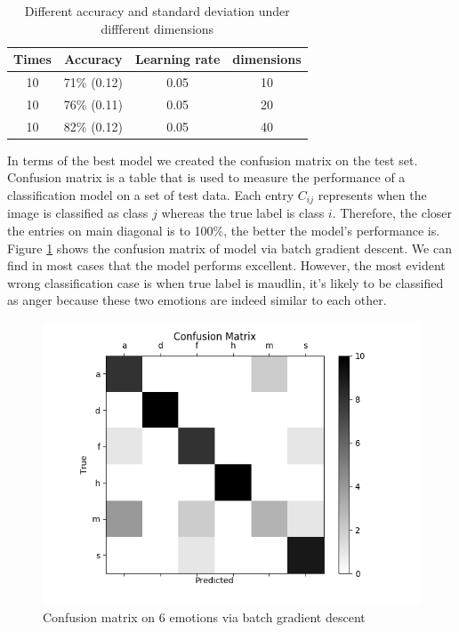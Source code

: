 \documentclass{article}
\begin{document}
\begin{table}
  \setlength{\tabcolsep}{9mm}
  \label{table: softmax_bgd}
  \centering
  \begin{tabular}{c|c|c|c}
    \toprule
    \cmidrule(r){1-4}
    Times     &Accuracy&Learning rate&dimensions \\
    \midrule
    10  &71\% (0.12)&0.05&10\\
    10  &76\% (0.11)&0.05&20\\
    10  &82\% (0.12)&0.05&40\\
    \bottomrule
  \end{tabular}
  \caption{Different accuracy and standard deviation under diffferent dimensions}
\end{table}
\par
In terms of the best model we created the confusion matrix on the test set. Confusion matrix is a table that is used to measure the performance of a classification model on a set of test data. Each entry $C_{ij}$ represents when the image is classified as class $j$ whereas the true label is class $i$. Therefore, the closer the entries on main diagonal is to 100\%, the better the model's performance is. Figure \ref{figure: confusion_bgd} shows the confusion matrix of model via batch gradient descent. We can find in most cases that the model performs excellent. However, the most evident wrong classification case is when true label is maudlin, it's likely to be classified as anger because these two emotions are indeed similar to each other.
\begin{figure}[ht]
\begin{center}
\includegraphics[scale=0.5]{images/confusion_bgd.png}
\end{center}
\caption{Confusion matrix on 6 emotions via batch gradient descent}
\label{figure: confusion_bgd}
\end{figure}
\end{document}
